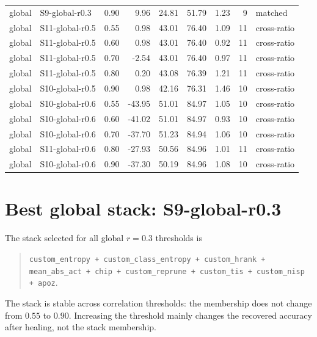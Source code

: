 \documentclass[11pt]{article}
\begin{document}
\begin{longtable}{llrrrrrrl}
global & S9-global-r0.3 & 0.90 & 9.96 & 24.81 & 51.79 & 1.23 & 9 & matched \\
global & S11-global-r0.5 & 0.55 & 0.98 & 43.01 & 76.40 & 1.09 & 11 & cross-ratio \\
global & S11-global-r0.5 & 0.60 & 0.98 & 43.01 & 76.40 & 0.92 & 11 & cross-ratio \\
global & S11-global-r0.5 & 0.70 & -2.54 & 43.01 & 76.40 & 0.97 & 11 & cross-ratio \\
global & S11-global-r0.5 & 0.80 & 0.20 & 43.08 & 76.39 & 1.21 & 11 & cross-ratio \\
global & S10-global-r0.5 & 0.90 & 0.98 & 42.16 & 76.31 & 1.46 & 10 & cross-ratio \\
global & S10-global-r0.6 & 0.55 & -43.95 & 51.01 & 84.97 & 1.05 & 10 & cross-ratio \\
global & S10-global-r0.6 & 0.60 & -41.02 & 51.01 & 84.97 & 0.93 & 10 & cross-ratio \\
global & S10-global-r0.6 & 0.70 & -37.70 & 51.23 & 84.94 & 1.06 & 10 & cross-ratio \\
global & S11-global-r0.6 & 0.80 & -27.93 & 50.56 & 84.96 & 1.01 & 11 & cross-ratio \\
global & S10-global-r0.6 & 0.90 & -37.30 & 50.19 & 84.96 & 1.08 & 10 & cross-ratio \\
\bottomrule\end{longtable}

\section*{Best global stack: S9-global-r0.3}
The stack selected for all global $r=0.3$ thresholds is
\begin{quote}
\texttt{custom\_entropy + custom\_class\_entropy + custom\_hrank + mean\_abs\_act + chip + custom\_reprune + custom\_tis + custom\_nisp + apoz}.
\end{quote}
The stack is stable across correlation thresholds: the membership does not change from $0.55$ to $0.90$.  Increasing the threshold mainly changes the recovered accuracy after healing, not the stack membership.
\end{document}
